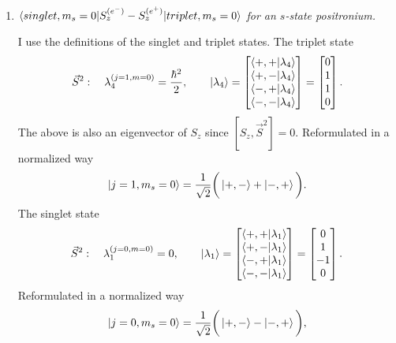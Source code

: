 \begin{example}
\begin{enumerate}
		\item \emph{$\braket{singlet,m_s=0|S_z^{(e^-)}-S_z^{(e^+)}|triplet,m_s=0}$ for an $s$-state positronium.} \newline
		
		I use the definitions of the singlet and triplet states. The triplet state
		\begin{equation}
			\vec{S}^2: \quad\lambda_4^{(j=1,m=0)}=\frac{\hbar^2}{2}, \qquad \ket{\lambda_4}=\begin{bmatrix}
				\braket{+,+|\lambda_4} \\
				\braket{+,-|\lambda_4} \\
				\braket{-,+|\lambda_4} \\
				\braket{-,-|\lambda_4} \\
			\end{bmatrix}=\begin{bmatrix}
				0 \\
				1 \\
				1 \\
				0 \\
			\end{bmatrix}.
		\end{equation} 
		The above is also an eigenvector of $S_z$ since $[S_z,\vec{S}^2]=0$. Reformulated in a normalized way
		\begin{equation}
			\ket{j=1,m_s=0}=\frac{1}{\sqrt{2}}\bigg(\ket{+,-}+\ket{-,+}\bigg).
		\end{equation} 
		The singlet state
		\begin{equation}
			\vec{S}^2: \quad\lambda_1^{(j=0,m=0)}=0, \qquad \ket{\lambda_1}=\begin{bmatrix}
				\braket{+,+|\lambda_1} \\
				\braket{+,-|\lambda_1} \\
				\braket{-,+|\lambda_1} \\
				\braket{-,-|\lambda_1} \\
			\end{bmatrix}=\begin{bmatrix}
				0 \\
				1 \\
				-1 \\
				0 \\
			\end{bmatrix}.
		\end{equation} 
		Reformulated in a normalized way
		\begin{equation}
			\ket{j=0,m_s=0}=\frac{1}{\sqrt{2}}\bigg(\ket{+,-}-\ket{-,+}\bigg),
		\end{equation} 

\end{enumerate}
\end{example}
